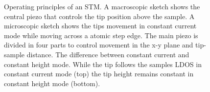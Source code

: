 %

\begin{figure}\centering
	\caption{Operating principles of an STM.  A macroscopic sketch  shows the central piezo that controls the tip position above the sample. A microscopic sketch shows the tips movement in constant current mode while moving across a atomic step edge. The main piezo is divided in four parts to control movement in the x-y plane and tip-sample distance\cite{STM-rutgers}.  The difference between constant current and constant height mode. While the tip follows the samples LDOS in constant current mode (top) the tip height remains constant in constant height mode (bottom)\cite{diss-manuela}.}
	\label{fig:STM-sketch}
\end{figure}

